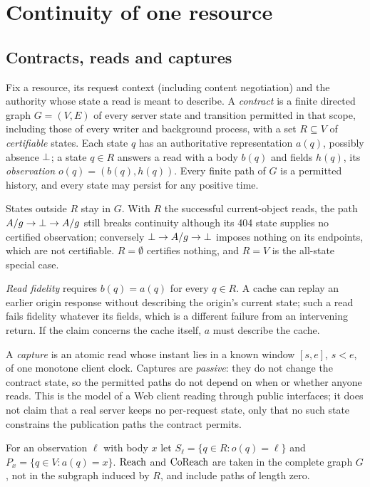 \section{Continuity of one resource}\label{sec:continuity}

\subsection{Contracts, reads and captures}
\begin{definition}[Contract]\label{def:contract}
Fix a resource, its request context (including content negotiation) and the
authority whose state a read is meant to describe. A \emph{contract} is a
finite directed graph $G=(V,E)$ of every server state and transition permitted
in that scope, including those of every writer and background process, with a
set $R\subseteq V$ of \emph{certifiable} states. Each state $q$ has an
authoritative representation $a(q)$, possibly absence $\bot$; a state
$q\in R$ answers a read with a body $b(q)$ and fields $h(q)$, its
\emph{observation} $o(q)=(b(q),h(q))$. Every finite path of $G$ is a
permitted history, and every state may persist for any positive time.
\end{definition}

States outside $R$ stay in $G$. With $R$ the successful current-object reads,
the path $A/g\to\bot\to A/g$ still breaks continuity although its 404 state
supplies no certified observation; conversely $\bot\to A/g\to\bot$
imposes nothing on its endpoints, which are not certifiable. $R=\emptyset$
certifies nothing, and $R=V$ is the all-state special case.

\emph{Read fidelity} requires $b(q)=a(q)$ for every $q\in R$. A cache can
replay an earlier origin response without describing the origin's current
state; such a read fails fidelity whatever its fields, which is a different
failure from an intervening return. If the claim concerns the cache itself,
$a$ must describe the cache.

A \emph{capture} is an atomic read whose instant lies in a known window
$[s,e]$, $s<e$, of one monotone client clock. Captures are \emph{passive}:
they do not change the contract state, so the permitted paths do not depend on
when or whether anyone reads. This is the model of a Web client reading
through public interfaces; it does not claim that a real server keeps no
per-request state, only that no such state constrains the publication paths
the contract permits.

For an observation $\ell$ with body $x$ let $S_\ell=\{q\in R : o(q)=\ell\}$ and
$P_x=\{q\in V : a(q)=x\}$. $\operatorname{Reach}$ and $\operatorname{CoReach}$ are taken in the complete
graph $G$, not in the subgraph induced by $R$, and include paths of length
zero.

